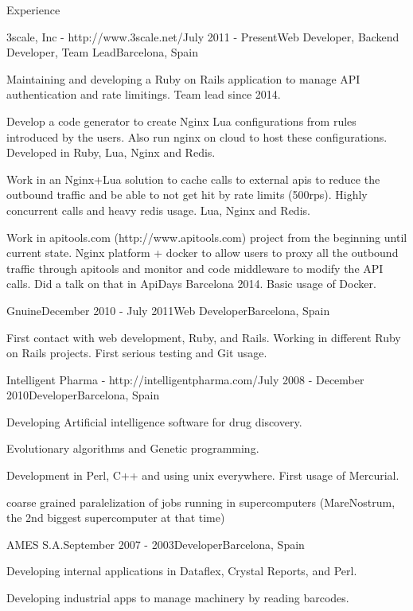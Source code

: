 \documentclass{resume} %
\begin{document}
\begin{rSection}{Experience}

\begin{rSubsection}{3scale, Inc - http://www.3scale.net/}{July 2011 - Present}{Web Developer, Backend Developer, Team Lead}{Barcelona, Spain}
\item Maintaining and developing a Ruby on Rails application to manage
  API authentication and rate limitings. Team lead since 2014.
\item Develop a code generator to create Nginx Lua configurations from
  rules introduced by the users. Also run nginx on cloud to host these
  configurations. Developed in Ruby, Lua, Nginx and Redis.
\item Work in an Nginx+Lua solution to cache calls to external apis to
  reduce the outbound traffic and be able to not get hit by rate
  limits (500rps). Highly concurrent calls and heavy redis usage. Lua,
  Nginx and Redis.
\item Work in apitools.com (http://www.apitools.com) project from the
  beginning until current state. Nginx platform + docker to allow
  users to proxy all the outbound traffic through apitools and monitor
  and code middleware to modify the API calls. Did a talk on that in
  ApiDays Barcelona 2014. Basic usage of Docker.
\end{rSubsection}


\begin{rSubsection}{Gnuine}{December 2010 - July 2011}{Web Developer}{Barcelona, Spain}
\item First contact with web development, Ruby, and Rails. Working in
  different Ruby on Rails projects. First serious testing and Git
  usage.
\end{rSubsection}


\begin{rSubsection}{Intelligent Pharma - http://intelligentpharma.com/}{July 2008 - December 2010}{Developer}{Barcelona, Spain}
\item Developing Artificial intelligence software for drug discovery.
\item Evolutionary algorithms and Genetic programming.
\item Development in Perl, C++ and using unix everywhere. First usage of Mercurial.
\item coarse grained paralelization of jobs running in supercomputers
  (MareNostrum, the 2nd biggest supercomputer at that time)
\end{rSubsection}


\begin{rSubsection}{AMES S.A.}{September 2007 - 2003}{Developer}{Barcelona, Spain}
\item Developing internal applications in Dataflex, Crystal Reports, and Perl.
\item Developing industrial apps to manage machinery by reading barcodes.
\end{rSubsection}

\end{rSection}
\end{document}
